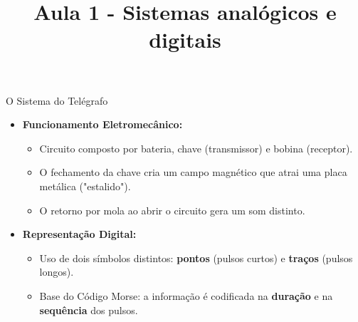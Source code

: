 \title{Aula 1 - Sistemas analógicos e digitais}



\begin{frame}
    \titlepage
\end{frame}


\begin{frame}{O Sistema do Telégrafo}
    \begin{itemize}
        \item \textbf{Funcionamento Eletromecânico:}
              \begin{itemize}
                  \item Circuito composto por bateria, chave (transmissor) e bobina (receptor).
                  \item O fechamento da chave cria um campo magnético que atrai uma placa metálica ("estalido").
                  \item O retorno por mola ao abrir o circuito gera um som distinto.
              \end{itemize}
        \item \textbf{Representação Digital:}
              \begin{itemize}
                  \item Uso de dois símbolos distintos: \textbf{pontos} (pulsos curtos) e \textbf{traços} (pulsos longos).
                  \item Base do Código Morse: a informação é codificada na \textbf{duração} e na \textbf{sequência} dos pulsos.
              \end{itemize}
    \end{itemize}

\end{frame}


